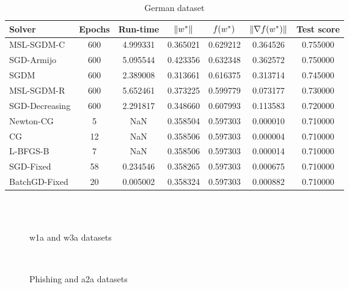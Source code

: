\begin{table}
\caption{German dataset}
\label{tab:german-tab}
\centering
\begin{tabular}{lS[drop-zero-decimal]S[round-precision=4]S[round-precision=6]S[round-precision=6]S[exponent-mode=scientific]S[round-precision=6]}
\toprule
Solver & {Epochs} & {Run-time} & {$\lVert w^\ast\rVert$} & {$\operatorname*{\mathit{f}}(w^\ast)$} & {$\lVert\nabla f(w^\ast)\rVert$} & {Test score} \\
\midrule
MSL-SGDM-C & 600 & 4.999331 & 0.365021 & 0.629212 & 0.364526 & 0.755000 \\
SGD-Armijo & 600 & 5.095544 & 0.423356 & 0.632348 & 0.362572 & 0.750000 \\
SGDM & 600 & 2.389008 & 0.313661 & 0.616375 & 0.313714 & 0.745000 \\
MSL-SGDM-R & 600 & 5.652461 & 0.373225 & 0.599779 & 0.073177 & 0.730000 \\
SGD-Decreasing & 600 & 2.291817 & 0.348660 & 0.607993 & 0.113583 & 0.720000 \\
Newton-CG & 5 & NaN & 0.358504 & 0.597303 & 0.000010 & 0.710000 \\
CG & 12 & NaN & 0.358506 & 0.597303 & 0.000004 & 0.710000 \\
L-BFGS-B & 7 & NaN & 0.358506 & 0.597303 & 0.000014 & 0.710000 \\
SGD-Fixed & 58 & 0.234546 & 0.358265 & 0.597303 & 0.000675 & 0.710000 \\
BatchGD-Fixed & 20 & 0.005002 & 0.358324 & 0.597303 & 0.000882 & 0.710000 \\
\bottomrule
\end{tabular}
\end{table}

\begin{figure}
\centering
 \\
 \\
\caption[]{w1a and w3a datasets}
\label{fig:w1a-w3a}
\end{figure}

\begin{figure}
\centering
 \\
\caption[]{Phishing and a2a datasets}
\label{fig:phish-a2a}
\end{figure}

